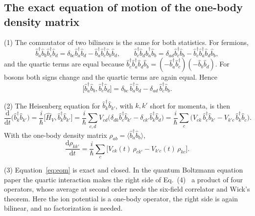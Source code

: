 \documentclass[11pt]{article}
\numberwithin{equation}{section}
\newcommand{\dd}{\mathrm d}
\begin{document}
\subsection{The exact equation of motion of the one-body density matrix}
{\noindent}(1) The commutator of two bilinears is the same for both
statistics. For fermions,
\begin{equation}
\hat b^\dagger_a\hat b_b\hat b^\dagger_c\hat b_d
=\delta_{bc}\hat b^\dagger_a\hat b_d-\hat b^\dagger_a\hat b^\dagger_c\hat b_b\hat b_d,\qquad
\hat b^\dagger_c\hat b_d\hat b^\dagger_a\hat b_b
=\delta_{ad}\hat b^\dagger_c\hat b_b-\hat b^\dagger_c\hat b^\dagger_a\hat b_d\hat b_b,
\end{equation}
and the quartic terms are equal because
$\hat b^\dagger_c\hat b^\dagger_a\hat b_d\hat b_b=(-\hat b^\dagger_a\hat b^\dagger_c)(-\hat b_b\hat b_d)$.
For bosons both signs change and the quartic terms are again equal. Hence
\begin{equation}
\big[\hat b^\dagger_a\hat b_b,\hat b^\dagger_c\hat b_d\big]=\delta_{bc}\,\hat b^\dagger_a\hat b_d-\delta_{ad}\,\hat b^\dagger_c\hat b_b.
\label{eq:bilinear}
\end{equation}

{\noindent}(2) The Heisenberg equation for $\hat b^\dagger_k\hat b_{k'}$, with
$k,k'$ short for momenta, is then
\begin{equation}
\frac{\dd}{\dd t}\big(\hat b^\dagger_k\hat b_{k'}\big)=\frac i\hbar\big[\hat H_V,\hat b^\dagger_k\hat b_{k'}\big]
=\frac i\hbar\sum_{c,d}V_{cd}\big(\delta_{dk}\hat b^\dagger_c\hat b_{k'}-\delta_{ck'}\hat b^\dagger_k\hat b_d\big)
=\frac i\hbar\sum_c\big(V_{ck}\,\hat b^\dagger_c\hat b_{k'}-V_{k'c}\,\hat b^\dagger_k\hat b_c\big).
\end{equation}
With the one-body density matrix $\rho_{ab}=\langle\hat b^\dagger_a\hat b_b\rangle$,
\begin{equation}
\boxed{\;\frac{\dd\rho_{kk'}}{\dd t}=\frac i\hbar\sum_c\big[V_{ck}(t)\,\rho_{ck'}-V_{k'c}(t)\,\rho_{kc}\big].\;}
\label{eq:eom}
\end{equation}

{\noindent}(3) Equation~\eqref{eq:eom} is exact and closed. In the quantum
Boltzmann equation paper the quartic interaction makes the right side of
Eq.~(4)~\cite{Watson2026} a product of four operators, whose average at second
order needs the six-field correlator and Wick's theorem. Here the ion
potential is a one-body operator, the right side is again bilinear, and no
factorization is needed.
\end{document}
